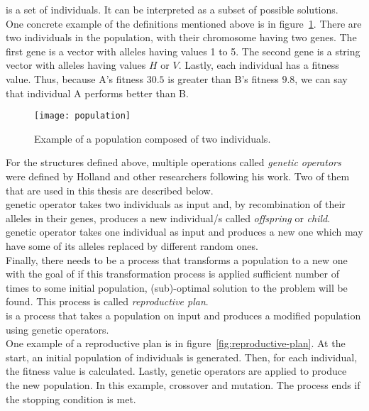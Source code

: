  is a set of individuals.
It can be interpreted as a subset of possible solutions.\\

One concrete example of the definitions mentioned above is in figure~\ref{fig:population}.
There are two individuals in the population, with their chromosome having two genes.
The first gene is a vector with alleles having values 1 to 5. The second gene is a string vector
with alleles having values $H$ or $V$. Lastly, each individual has a fitness value.
Thus, because A’s fitness $30.5$ is greater than B’s fitness $9.8$, we can say
that individual A performs better than B.


\begin{figure}
    \texttt{[image: population]}
    \caption[Population example]{Example of a population composed of two individuals.}
    \label{fig:population}
\end{figure}

For the structures defined above, multiple operations called \textit{genetic operators}
were defined by Holland and other researchers following his work.
Two of them that are used in this thesis are described below.\\

 genetic operator takes two individuals as input and, by recombination
of their alleles in their genes, produces a new individual/s called \textit{offspring} or \textit{child}.\\

 genetic operator takes one individual as input and produces a new one
which may have some of its alleles replaced by different random ones.\\

Finally, there needs to be a process that transforms a population
to a new one with the goal of if this transformation process is applied sufficient
number of times to some initial population,
(sub)-optimal solution to the problem will be found.
This process is called \textit{reproductive plan}.\\

 is a process that takes a population on input and produces a modified
population using genetic operators.\\

One example of a reproductive plan is in figure~\ref{fig:reproductive-plan}.
At the start, an initial population of individuals is generated.
Then, for each individual, the fitness value is calculated.
Lastly, genetic operators are applied to produce the new population.
In this example, crossover and mutation.
The process ends if the stopping condition is met.

